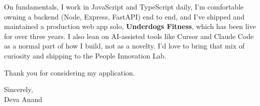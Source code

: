 \documentclass[letterpaper,11pt]{article}
\begin{document}
On fundamentals, I work in JavaScript and TypeScript daily, I'm comfortable owning a backend (Node, Express, FastAPI) end to end, and I've shipped and maintained a production web app solo, \textbf{Underdogs Fitness}, which has been live for over three years. I also lean on AI-assisted tools like Cursor and Claude Code as a normal part of how I build, not as a novelty. I'd love to bring that mix of curiosity and shipping to the People Innovation Lab.

Thank you for considering my application.

\vspace{8pt}
Sincerely, \\
Deva Anand
\end{document}
